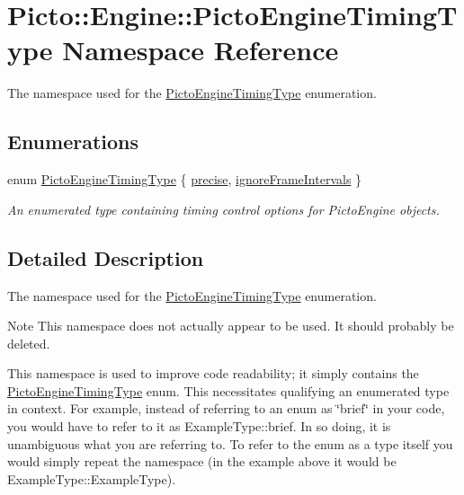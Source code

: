 \hypertarget{namespace_picto_1_1_engine_1_1_picto_engine_timing_type}{\section{Picto\-:\-:Engine\-:\-:Picto\-Engine\-Timing\-Type Namespace Reference}
\label{namespace_picto_1_1_engine_1_1_picto_engine_timing_type}
}


The namespace used for the \hyperlink{namespace_picto_1_1_engine_1_1_picto_engine_timing_type}{Picto\-Engine\-Timing\-Type} enumeration.  


\subsection*{Enumerations}
\begin{DoxyCompactItemize}
\item 
enum \hyperlink{namespace_picto_1_1_engine_1_1_picto_engine_timing_type_a3b9833c69033de872a089c4c79a7496c}{Picto\-Engine\-Timing\-Type} \{ \hyperlink{namespace_picto_1_1_engine_1_1_picto_engine_timing_type_a3b9833c69033de872a089c4c79a7496ca53ec905db7963529412112d01a663492}{precise}, 
\hyperlink{namespace_picto_1_1_engine_1_1_picto_engine_timing_type_a3b9833c69033de872a089c4c79a7496ca3c573955bb912e564ac0a7ce0983ef38}{ignore\-Frame\-Intervals}
 \}
\begin{DoxyCompactList}\small\item\em An enumerated type containing timing control options for Picto\-Engine objects. \end{DoxyCompactList}\end{DoxyCompactItemize}


\subsection{Detailed Description}
The namespace used for the \hyperlink{namespace_picto_1_1_engine_1_1_picto_engine_timing_type}{Picto\-Engine\-Timing\-Type} enumeration. \begin{DoxyNote}{Note}
This namespace does not actually appear to be used. It should probably be deleted.
\end{DoxyNote}
This namespace is used to improve code readability; it simply contains the \hyperlink{namespace_picto_1_1_engine_1_1_picto_engine_timing_type}{Picto\-Engine\-Timing\-Type} enum. This necessitates qualifying an enumerated type in context. For example, instead of referring to an enum as \char`\"{}brief\char`\"{} in your code, you would have to refer to it as Example\-Type\-::brief. In so doing, it is unambiguous what you are referring to. To refer to the enum as a type itself you would simply repeat the namespace (in the example above it would be Example\-Type\-::\-Example\-Type). 

